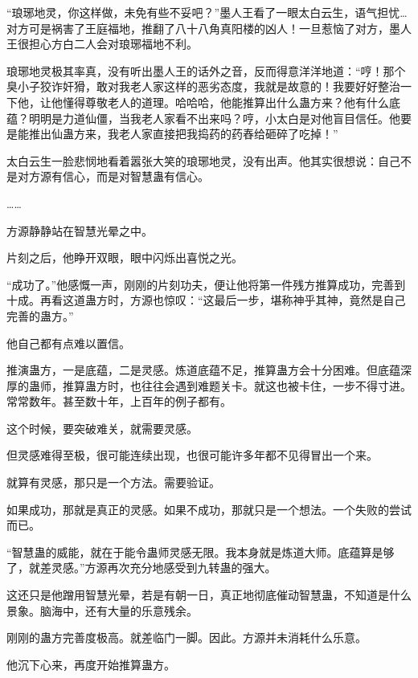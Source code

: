 
\begin{this_body}



“琅琊地灵，你这样做，未免有些不妥吧？”墨人王看了一眼太白云生，语气担忧…对方可是祸害了王庭福地，推翻了八十八角真阳楼的凶人！一旦惹恼了对方，墨人王很担心方白二人会对琅琊福地不利。

琅琊地灵极其率真，没有听出墨人王的话外之音，反而得意洋洋地道：“哼！那个臭小子狡诈奸猾，敢对我老人家这样的恶劣态度，我就是故意的！我要好好整治一下他，让他懂得尊敬老人的道理。哈哈哈，他能推算出什么蛊方来？他有什么底蕴？明明是力道仙僵，当我老人家看不出来吗？哼，小太白是对他盲目信任。他要是能推出仙蛊方来，我老人家直接把我捣药的药舂给砸碎了吃掉！”

太白云生一脸悲悯地看着嚣张大笑的琅琊地灵，没有出声。他其实很想说：自己不是对方源有信心，而是对智慧蛊有信心。

……

方源静静站在智慧光晕之中。

片刻之后，他睁开双眼，眼中闪烁出喜悦之光。

“成功了。”他感慨一声，刚刚的片刻功夫，便让他将第一件残方推算成功，完善到十成。再看这道蛊方时，方源也惊叹：“这最后一步，堪称神乎其神，竟然是自己完善的蛊方。”

他自己都有点难以置信。

推演蛊方，一是底蕴，二是灵感。炼道底蕴不足，推算蛊方会十分困难。但底蕴深厚的蛊师，推算蛊方时，也往往会遇到难题关卡。就这也被卡住，一步不得寸进。常常数年。甚至数十年，上百年的例子都有。

这个时候，要突破难关，就需要灵感。

但灵感难得至极，很可能连续出现，也很可能许多年都不见得冒出一个来。

就算有灵感，那只是一个方法。需要验证。

如果成功，那就是真正的灵感。如果不成功，那就只是一个想法。一个失败的尝试而已。

“智慧蛊的威能，就在于能令蛊师灵感无限。我本身就是炼道大师。底蕴算是够了，就差灵感。”方源再次充分地感受到九转蛊的强大。

这还只是他蹭用智慧光晕，若是有朝一日，真正地彻底催动智慧蛊，不知道是什么景象。脑海中，还有大量的乐意残余。

刚刚的蛊方完善度极高。就差临门一脚。因此。方源并未消耗什么乐意。

他沉下心来，再度开始推算蛊方。


\end{this_body}
